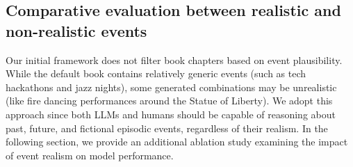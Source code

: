 \documentclass{article}
\begin{document}
\subsection{Comparative evaluation between realistic and non-realistic events}\label{app:ablation_realistic}

Our initial framework does not filter book chapters based on event plausibility. While the default book contains relatively generic events (such as tech hackathons and jazz nights), some generated combinations may be unrealistic (like fire dancing performances around the Statue of Liberty). We adopt this approach since both LLMs and humans should be capable of reasoning about past, future, and fictional episodic events, regardless of their realism. In the following section, we provide an additional ablation study examining the impact of event realism on model performance.
\end{document}
